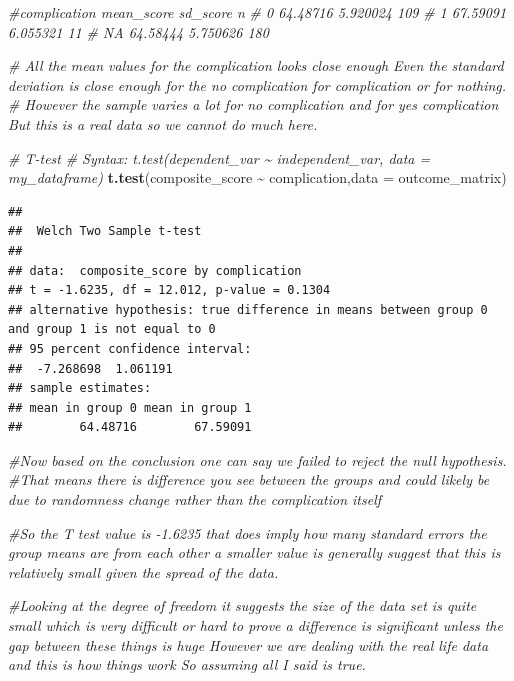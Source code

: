 \documentclass[
]{article}
\newenvironment{Shaded}{\begin{snugshade}}{\end{snugshade}}
\newcommand{\AttributeTok}[1]{\textcolor[rgb]{0.13,0.29,0.53}{#1}}
\newcommand{\CommentTok}[1]{\textcolor[rgb]{0.56,0.35,0.01}{\textit{#1}}}
\newcommand{\FunctionTok}[1]{\textcolor[rgb]{0.13,0.29,0.53}{\textbf{#1}}}
\newcommand{\NormalTok}[1]{#1}
\newcommand{\SpecialCharTok}[1]{\textcolor[rgb]{0.81,0.36,0.00}{\textbf{#1}}}
\begin{document}
\begin{Shaded}
\begin{Highlighting}[]
\CommentTok{\#complication   mean\_score  sd\_score    n}
\CommentTok{\#  0              64.48716  5.920024    109     }
\CommentTok{\#  1              67.59091  6.055321    11  }
\CommentTok{\#  NA               64.58444    5.750626    180 }

\CommentTok{\# All the mean values for the complication looks close enough Even the standard deviation is close enough for the no complication for complication or for nothing. }
\CommentTok{\# However the sample varies a lot for no complication and for yes complication But this is a real data so we cannot do much here.}


\CommentTok{\# T{-}test}
\CommentTok{\# Syntax: t.test(dependent\_var \textasciitilde{} independent\_var, data = my\_dataframe)}
\FunctionTok{t.test}\NormalTok{(composite\_score }\SpecialCharTok{\textasciitilde{}}\NormalTok{ complication,}\AttributeTok{data =}\NormalTok{ outcome\_matrix)}
\end{Highlighting}
\end{Shaded}

\begin{verbatim}
## 
##  Welch Two Sample t-test
## 
## data:  composite_score by complication
## t = -1.6235, df = 12.012, p-value = 0.1304
## alternative hypothesis: true difference in means between group 0 and group 1 is not equal to 0
## 95 percent confidence interval:
##  -7.268698  1.061191
## sample estimates:
## mean in group 0 mean in group 1 
##        64.48716        67.59091
\end{verbatim}

\begin{Shaded}
\begin{Highlighting}[]
\CommentTok{\#Now based on the conclusion one can say we failed to reject the null hypothesis.}
\CommentTok{\#That means there is difference you see between the groups and could likely be due to randomness change rather than the complication itself}


\CommentTok{\#So the T test value is {-}1.6235 that does imply how many standard errors the group means are from each other a smaller value is generally suggest that this is relatively small given the spread of the data.}

\CommentTok{\#Looking at the degree of freedom it suggests the size of the data set is quite small which is very difficult or hard to prove a difference is significant unless the gap between these things is huge However we are dealing with the real life data and this is how things work So assuming all I said is true.}
\end{Highlighting}
\end{Shaded}
\end{document}
